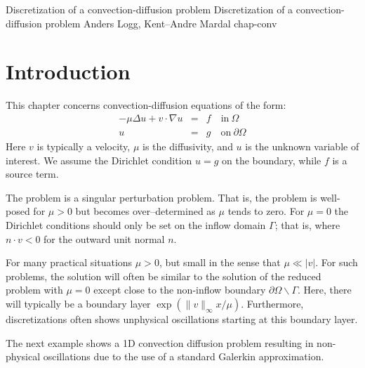               {Discretization of a convection-diffusion problem}
              {Discretization of a convection-diffusion problem} 
              {Anders Logg, Kent--Andre Mardal} 
              {chap-conv}   



\label{chap-conv}
\section{Introduction}
This chapter concerns convection-diffusion equations of the form: 
\begin{eqnarray*}
-\mu\Delta u + v\cdot \nabla u  &=& f \quad \textrm{in}\ \Omega\\
u&=& g \quad \textrm{on}\ \partial\Omega
\end{eqnarray*}
Here $v$ is  typically a velocity, $\mu$ is the diffusivity,  and $u$ is the 
unknown variable of interest. We assume the Dirichlet condition $u=g$ on 
the boundary, while $f$ is a source term.  

The problem is a singular perturbation problem. That is, the problem is well-posed for $\mu > 0$ but becomes over--determined as $\mu$ tends to zero. For $\mu=0$ the Dirichlet conditions should only be set on the inflow domain $\Gamma$; that is, where $n \cdot v < 0$ for the outward unit normal $n$. 

For many practical situations $\mu>0$, but small in the sense that $\mu \ll |v|$. For such problems, the solution 
will often be similar to the solution of the reduced problem with $\mu=0$ except close to the 
non-inflow boundary $\partial \Omega \backslash \Gamma$. Here, there will typically be a boundary layer $\exp{(\|v\|_\infty x / \mu)}$.      
Furthermore, discretizations often shows unphysical oscillations starting at this boundary layer.    

The next example shows a 1D convection diffusion problem resulting in non-physical oscillations due to the use
of a standard Galerkin approximation. 

